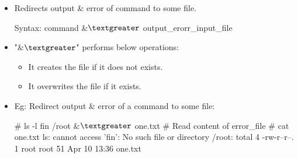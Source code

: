 \setlength{\columnsep}{3pt}
\begin{flushleft}

	\begin{itemize}
	\item Redirects output \& error of command to some file.
	\bigskip
	\begin{tcolorbox}[breakable,notitle,boxrule=-0pt,colback=pink,colframe=pink]
		\color{black}
		\font=9pt
		Syntax: command \&{$\textgreater$} output\_erorr\_input\_file
		\font=4pt
	\end{tcolorbox}
	\item "\&{$\textgreater$}" performs below operations:
	\begin{itemize}
		\item It creates the file if it does not exists.
		\item It overwrites the file if it exists.
	\end{itemize}
	\item
	Eg: Redirect output \& error of a command to some file:
	\bigskip
	\begin{tcolorbox}[breakable,notitle,boxrule=-0pt,colback=black,colframe=black]
		\color{green}
		\font=9pt
		\# ls -l fin /root \&{$\textgreater$} one.txt
		\newline
		\newline
		\color{yellow}
		\# Read content of error\_file
		\color{green}
		\newline
		\# cat one.txt
		\newline
		\color{white}
		ls: cannot access 'fin': No such file or directory
		\newline
		/root:
		\color{white}
		\newline
		total 4
		\color{white}
		\newline
		\color{white} -rw-r--r--. 1 root root 51 Apr 10 13:36 one.txt
		\font=4pt
	\end{tcolorbox}
\end{itemize}
\end{flushleft}



